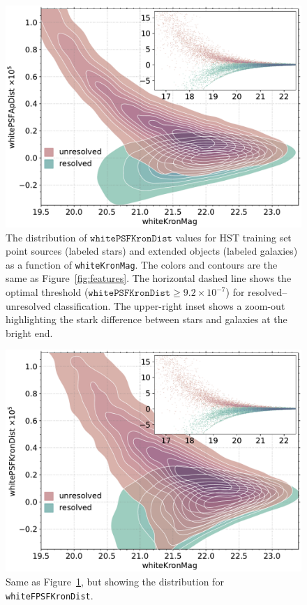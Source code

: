 \documentclass[twocolumn]{aastex63}
\begin{document}
\begin{figure}
    \centering
    \includegraphics[width=\columnwidth]{./figures/whiteFPSFApDist.pdf}
    \caption{The distribution of $\mathtt{whitePSFKronDist}$ values for HST
    training set point sources (labeled stars) and extended objects (labeled
    galaxies) as a function of \texttt{whiteKronMag}. The colors and contours
    are the same as Figure~\ref{fig:features}. The horizontal dashed line
    shows the optimal threshold ($\mathtt{whitePSFKronDist} \ge 9.2 \times
    10^{-7}$) for resolved--unresolved classification. The upper-right inset
    shows a zoom-out highlighting the stark difference between stars and
    galaxies at the bright end.}
    \label{fig:psf_ap}
\end{figure}

\begin{figure}
    \centering
    \includegraphics[width=\columnwidth]{./figures/whiteFPSFKronDist.pdf}
    \caption{Same as Figure~\ref{fig:psf_ap}, but showing the distribution for
    \texttt{whiteFPSFKronDist}.}
    \label{fig:psf_kron}
\end{figure}  
\end{document}
